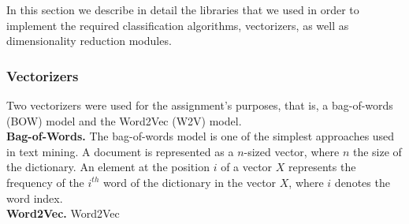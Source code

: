 In this section we describe in detail the libraries that we used in order to implement the required classification algorithms, vectorizers, as well as dimensionality reduction modules.
%
\subsubsection{Vectorizers}
Two vectorizers were used for the assignment’s purposes, that is, a bag-of-words (BOW) model and the Word2Vec (W2V) model.
\\
\textbf{Bag-of-Words.} The bag-of-words \cite{BoW} model is one of the simplest approaches used in text mining. A document is represented as a $n$-sized vector, where $n$ the size of the dictionary. An element at the position $i$ of a vector $X$ represents the frequency of the $i^{th}$ word of the dictionary in the vector $X$, where $i$ denotes the word index.
\\
\textbf{Word2Vec.} Word2Vec \cite{mikolov2013distributed}